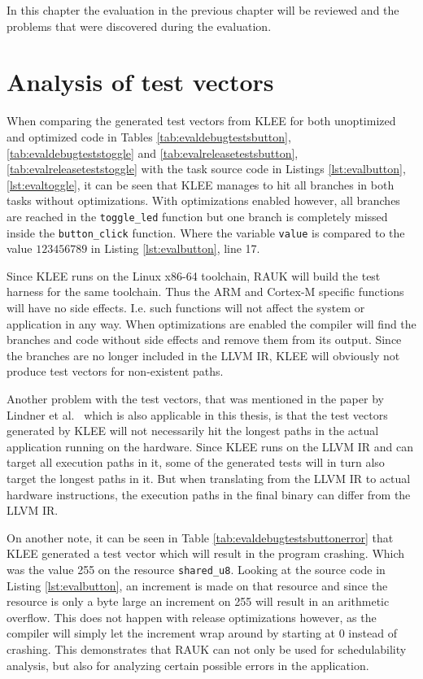 In this chapter the evaluation in the previous chapter will be reviewed
and the problems that were discovered during the evaluation.

\section{Analysis of test vectors}
When comparing the generated test vectors from KLEE for both unoptimized and
optimized code in Tables \ref{tab:evaldebugtestsbutton},
\ref{tab:evaldebugteststoggle} and \ref{tab:evalreleasetestsbutton},
\ref{tab:evalreleaseteststoggle} with the task source code in Listings
\ref{lst:evalbutton}, \ref{lst:evaltoggle}, it can be seen that KLEE manages to
hit all branches in both tasks without optimizations. With optimizations
enabled however, all branches are reached in the \texttt{toggle\_led} function
but one branch is completely missed inside the \texttt{button\_click} function.
Where the variable \texttt{value} is compared to the value $123456789$ in
Listing \ref{lst:evalbutton}, line 17.

Since KLEE runs on the Linux x86-64 toolchain, RAUK will build the test harness
for the same toolchain. Thus the ARM and Cortex-M specific functions will have
no side effects. I.e. such functions will not affect the system or application
in any way. When optimizations are enabled the compiler will find the branches
and code without side effects and remove them from its output. Since the
branches are no longer included in the LLVM IR, KLEE will obviously not
produce test vectors for non-existent paths.

Another problem with the test vectors, that was mentioned in the paper by
Lindner et al.\ \cite{lindner} which is also applicable in this thesis, is that
the test vectors generated by KLEE will not necessarily hit the longest paths
in the actual application running on the hardware. Since KLEE runs on the LLVM
IR and can target all execution paths in it, some of the generated tests will
in turn also target the longest paths in it. But when translating from the LLVM
IR to actual hardware instructions, the execution paths in the final binary can
differ from the LLVM IR.

On another note, it can be seen in Table \ref{tab:evaldebugtestsbuttonerror}
that KLEE generated a test vector which will result in the program crashing.
Which was the value 255 on the resource \texttt{shared\_u8}. Looking at the
source code in Listing \ref{lst:evalbutton}, an increment is made on that
resource and since the resource is only a byte large an increment on 255 will
result in an arithmetic overflow. This does not happen with release
optimizations however, as the compiler will simply let the increment wrap
around by starting at 0 instead of crashing. This demonstrates that RAUK
can not only be used for schedulability analysis, but also for analyzing
certain possible errors in the application.

